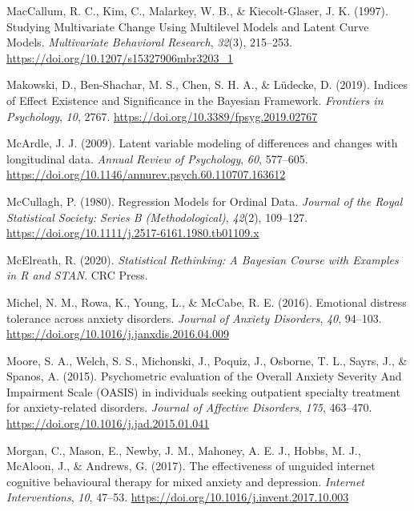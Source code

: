 \documentclass[
  man,floatsintext]{apa7}
\newlength{\cslhangindent}
\newlength{\cslentryspacingunit} %
\newenvironment{CSLReferences}[2] %
 {%
  \setlength{\parindent}{0pt}
  \ifodd #1
  \let\oldpar\par
  \def\par{\hangindent=\cslhangindent\oldpar}
  \fi
  \setlength{\parskip}{#2\cslentryspacingunit}
 }%
 {}
\begin{document}
\begin{CSLReferences}{1}{0}
\leavevmode{}%
MacCallum, R. C., Kim, C., Malarkey, W. B., \& Kiecolt-Glaser, J. K. (1997). Studying Multivariate Change Using Multilevel Models and Latent Curve Models. \emph{Multivariate Behavioral Research}, \emph{32}(3), 215--253. \url{https://doi.org/10.1207/s15327906mbr3203_1}

\leavevmode{}%
Makowski, D., Ben-Shachar, M. S., Chen, S. H. A., \& Lüdecke, D. (2019). Indices of Effect Existence and Significance in the Bayesian Framework. \emph{Frontiers in Psychology}, \emph{10}, 2767. \url{https://doi.org/10.3389/fpsyg.2019.02767}

\leavevmode{}%
McArdle, J. J. (2009). Latent variable modeling of differences and changes with longitudinal data. \emph{Annual Review of Psychology}, \emph{60}, 577--605. \url{https://doi.org/10.1146/annurev.psych.60.110707.163612}

\leavevmode{}%
McCullagh, P. (1980). Regression Models for Ordinal Data. \emph{Journal of the Royal Statistical Society: Series B (Methodological)}, \emph{42}(2), 109--127. \url{https://doi.org/10.1111/j.2517-6161.1980.tb01109.x}

\leavevmode{}%
McElreath, R. (2020). \emph{Statistical Rethinking: A Bayesian Course with Examples in R and STAN}. CRC Press.

\leavevmode{}%
Michel, N. M., Rowa, K., Young, L., \& McCabe, R. E. (2016). Emotional distress tolerance across anxiety disorders. \emph{Journal of Anxiety Disorders}, \emph{40}, 94--103. \url{https://doi.org/10.1016/j.janxdis.2016.04.009}

\leavevmode{}%
Moore, S. A., Welch, S. S., Michonski, J., Poquiz, J., Osborne, T. L., Sayrs, J., \& Spanos, A. (2015). Psychometric evaluation of the Overall Anxiety Severity And Impairment Scale (OASIS) in individuals seeking outpatient specialty treatment for anxiety-related disorders. \emph{Journal of Affective Disorders}, \emph{175}, 463--470. \url{https://doi.org/10.1016/j.jad.2015.01.041}

\leavevmode{}%
Morgan, C., Mason, E., Newby, J. M., Mahoney, A. E. J., Hobbs, M. J., McAloon, J., \& Andrews, G. (2017). The effectiveness of unguided internet cognitive behavioural therapy for mixed anxiety and depression. \emph{Internet Interventions}, \emph{10}, 47--53. \url{https://doi.org/10.1016/j.invent.2017.10.003}


\end{CSLReferences}
\end{document}
